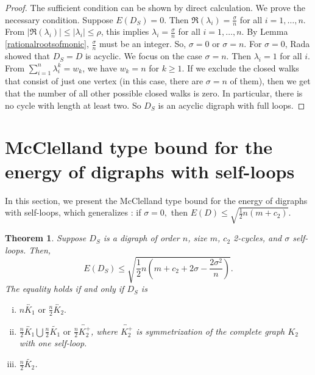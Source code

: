 \documentclass[12pt,a4paper,reqno]{amsart}
\numberwithin{equation}{section}
\theoremstyle{plain}
\newtheorem{theorem}{Theorem}[section]
\theoremstyle{definition}
\newcommand{\<}{\langle}
\renewcommand{\>}{\rangle}
\begin{document}
\begin{proof}
	The sufficient condition can be shown by direct calculation. We prove the necessary condition.
	Suppose $E(D_S)=0$. Then $\Re(\lambda_i)=\frac{\sigma}{n}$ for all $i=1,\ldots,n$. From $|\Re(\lambda_i)| \leq |\lambda_i| \leq \rho$, this implies $\lambda_i=\frac{\sigma}{n}$ for all $i=1,\ldots,n$. By Lemma \ref{rationalrootsofmonic}, $\frac{\sigma}{n}$ must be an integer. So, $\sigma=0$ or $\sigma=n$. For $\sigma=0$, Rada \cite[Proposition 2.1]{rada2009mcclelland} showed that $D_S=D$ is acyclic. We focus on the case $\sigma=n$. Then $\lambda_i=1$ for all $i$. From $\sum_{i=1}^n \lambda^k_i=w_k$, we have $w_k=n$ for $k \geq 1$. If we exclude the closed walks that consist of just one vertex (in this case, there are $\sigma=n$ of them), then we get that the number of all other possible closed walks is zero. In particular, there is no cycle with length at least two. So $D_S$ is an acyclic digraph with full loops.
\end{proof}

\section{McClelland type bound for the energy of digraphs with self-loops}
\label{sec4}

In this section, we present the McClelland type bound for the energy of digraphs with self-loops, which generalizes \cite[Theorem 2.3]{rada2009mcclelland}: if $\sigma=0,$ then $E(D)\leq \sqrt{ \frac{1}{2}n \left ( m+c_2\right) }.$ 
	

\begin{theorem}
	\label{E(D_S)_leq_sqrt}
	Suppose $D_S$ is a digraph of order $n$, size $m$, $c_2$ 2-cycles, and $\sigma$ self-loops. Then,
	\begin{equation}
		\label{energyinsqrt}
		E(D_S)\leq \sqrt{ \frac{1}{2}n \left ( m+c_2+ 2\sigma-\frac{2\sigma^2}{n} \right) }.
	\end{equation}
	The equality holds if and only if $D_S$ is 
        \begin{enumerate}[(i)]
            \item $ n\overleftrightarrow{K_1} \text{ or } \frac{n}{2} \overleftrightarrow{K_2}.$
            \item $\frac{n}{2}\overleftrightarrow{K_1} \bigcup \frac{n}{2}\widetilde{K_1} \text{ or } \frac{n}{2}\overleftrightarrow{K_2^+}$,
            where $\overleftrightarrow{K_2^+}$ is symmetrization of the complete graph $K_2$ with one self-loop. 
            \item$\frac{n}{2}\widetilde{K_2}$.
        \end{enumerate}
\end{theorem}
\end{document}
